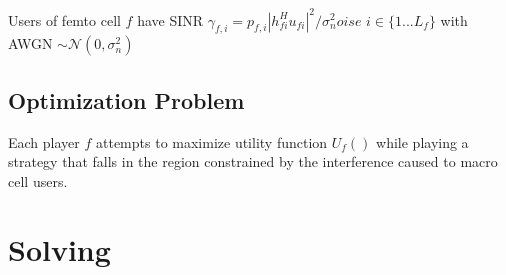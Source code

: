 \documentclass[12pt]{article}
\begin{document}
Users of femto cell $f$ have SINR $\gamma_{f,i} = p_{f,i}|h^H_{fi}u_{fi}|^2/\sigma^2_noise$   $i \in \{1 ... L_f\}$
with AWGN $\sim \mathcal{N}(0,\sigma^2_n)$
\\

\subsection{Optimization Problem}

Each player $f$ attempts to maximize utility function $U_f()$ while playing a strategy that falls in the region constrained by the interference caused to macro cell users.


\section{Solving}
\end{document}
